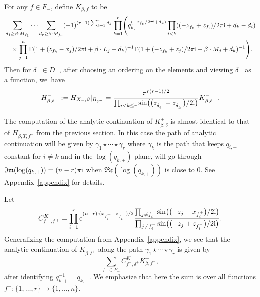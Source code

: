 \documentclass[pdftex]{sigma}
\numberwithin{equation}{section}
\newcommand{\MB}{M}
\newcommand{\LB}{L}
\newcommand{\z}{z}
\newcommand{\x}{x}
\begin{document}
For any $f \in F_-$, define
 $K^{-}_{\beta, f}$ to be
\begin{align*}
&\sum_{d_1 \geq \beta \cdot \MB_{f_1}} \cdots \sum _{d_r \geq \beta \cdot \MB_{f_r}} (-1)^{(r-1) \sum_{k=1}^r d_k}\prod_{k=1}^r \Biggl(q_{k, -}^{(- \z_{f_k}/2\pi {\rm i} + d_k)}
\prod_{i < k} ( (- \z_{f_k} + \z_{f_i} )/2 \pi {\rm i} + d_k - d_i )
 \\
&\quad{}\times \prod_{j=1}^n\Gamma (1+ ( \z_{f_k}-\x_j )/2 \pi {\rm i}+\beta\cdot \LB_j-d_k )^{-1}\Gamma (1+ (-\z_{f_k}+\z_j )/2 \pi {\rm i}-\beta\cdot \MB_j+d_k )^{-1}\Biggr).
\end{align*}
Then for $\delta^- \in D_-$, after choosing an ordering on the elements and viewing $\delta^-$ as a function, we~have
\begin{equation}\label{HBM}
 H^{-}_{\beta, \delta^-} := H_{X_-, \beta}|_{B_{\delta^-}} =
\frac{\pi^{r(r-1)/2}}{\prod_{i<k\leq r} \sin\bigl(\bigl(\z_{\delta^-_i} - \z_{\delta^-_k}\bigr)/2{\rm i}\bigr)} K^{-}_{\beta, \delta^-}.
\end{equation}



The computation of the analytic continuation of $K_{\beta,\delta}^{+}$ is almost identical to that of $H_{\beta, T, f^+}$ from the previous section.
In this case the path of analytic continuation will be given by $\gamma_1 \star \cdots \star \gamma_r$ where
$\gamma_k$
is the path that keeps $q_{i, +}$ constant for $i \neq k$ and in the
 $\log(q_{k, +})$ plane, will go through $\mathfrak{Im}(\log(q_{k, +})) = (n-r)\pi {\rm i}$ when $\mathfrak{Re}(\log(q_{k,+}))$ is close to 0. See Appendix~\ref{appendix} for details.

Let
\[
C^K_{f^-, f^+} = \prod_{i=1}^r {\rm e}^{ (n-r)\cdot ( \x_{f^+_i}-\z_{f^-_i})/2 }\frac{ \prod_{j\neq {f^-_i}} \sin\bigl( \bigl(-\z_j+\x_{f^+_i}\bigr)/2 {\rm i}\bigr) }{\prod_{j \neq {f^-_i}}\sin\bigl(\bigl(-\z_j + \z_{f^-_i}\bigr)/2 {\rm i}\bigr)}.
\]
Generalizing the computation from Appendix~\ref{appendix},
we see that the analytic continuation of $K^{+}_{\beta, \delta^+}$ along the path
$\gamma_1 \star \cdots \star \gamma_r$ is given by
\begin{equation}\label{ancon}\sum_{f^- \in F_-} C^K_{f^-, \delta^+} K^{-}_{\beta, f^-},\end{equation}
after identifying $q_{k, +}^{-1} = q_{k, -}$. We emphasize that here the sum is over all functions $f^-\colon \{1, \dots, r\} \allowbreak \to \{1, \dots, n\}$.
\end{document}
